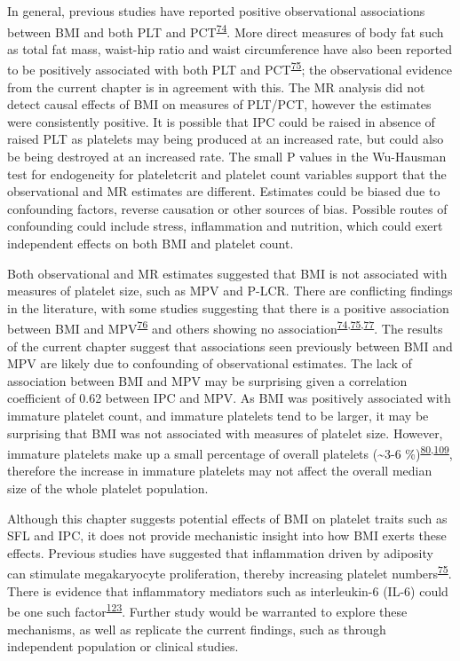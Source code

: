 \documentclass[11pt,twoside]{bristolthesis}
\begin{document}
In general, previous studies have reported positive observational associations between BMI and both PLT and PCT\textsuperscript{\protect\hyperlink{ref-Furuncuoglu2016}{74}}. More direct measures of body fat such as total fat mass, waist-hip ratio and waist circumference have also been reported to be positively associated with both PLT and PCT\textsuperscript{\protect\hyperlink{ref-Han2018a}{75}}; the observational evidence from the current chapter is in agreement with this. The MR analysis did not detect causal effects of BMI on measures of PLT/PCT, however the estimates were consistently positive. It is possible that IPC could be raised in absence of raised PLT as platelets may being produced at an increased rate, but could also be being destroyed at an increased rate. The small P values in the Wu-Hausman test for endogeneity for plateletcrit and platelet count variables support that the observational and MR estimates are different. Estimates could be biased due to confounding factors, reverse causation or other sources of bias. Possible routes of confounding could include stress, inflammation and nutrition, which could exert independent effects on both BMI and platelet count.

Both observational and MR estimates suggested that BMI is not associated with measures of platelet size, such as MPV and P-LCR. There are conflicting findings in the literature, with some studies suggesting that there is a positive association between BMI and MPV\textsuperscript{\protect\hyperlink{ref-Coban2005}{76}} and others showing no association\textsuperscript{\protect\hyperlink{ref-Furuncuoglu2016}{74},\protect\hyperlink{ref-Han2018a}{75},\protect\hyperlink{ref-Heffron2018}{77}}. The results of the current chapter suggest that associations seen previously between BMI and MPV are likely due to confounding of observational estimates. The lack of association between BMI and MPV may be surprising given a correlation coefficient of 0.62 between IPC and MPV. As BMI was positively associated with immature platelet count, and immature platelets tend to be larger, it may be surprising that BMI was not associated with measures of platelet size. However, immature platelets make up a small percentage of overall platelets (\textasciitilde3-6 \%)\textsuperscript{\protect\hyperlink{ref-Ibrahim2014}{80},\protect\hyperlink{ref-Bernlochner2015a}{109}}, therefore the increase in immature platelets may not affect the overall median size of the whole platelet population.

Although this chapter suggests potential effects of BMI on platelet traits such as SFL and IPC, it does not provide mechanistic insight into how BMI exerts these effects. Previous studies have suggested that inflammation driven by adiposity can stimulate megakaryocyte proliferation, thereby increasing platelet numbers\textsuperscript{\protect\hyperlink{ref-Han2018a}{75}}. There is evidence that inflammatory mediators such as interleukin-6 (IL-6) could be one such factor\textsuperscript{\protect\hyperlink{ref-Kaser2001}{123}}. Further study would be warranted to explore these mechanisms, as well as replicate the current findings, such as through independent population or clinical studies.
\end{document}
